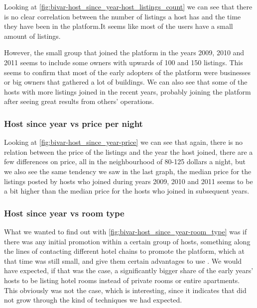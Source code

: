 Looking at \cref{fig:bivar-host_since_year-host_listings_count} we can see that
there is no clear correlation between the number of listings a host has and the
time they have been in the platform.It seems like most of the users have a small
amount of listings.

However, the small group that joined the platform in the years 2009, 2010 and
2011 seems to include some owners with upwards of 100 and 150 listings. This
seems to confirm that most of the early adopters of the platform were businesses
or big owners that gathered a lot of buildings. We can also see that some of the
hosts with more listings joined in the recent years, probably joining the
platform after seeing great results from others' operations.


\pagebreak
\subsubsection{Host since year vs price per night}


Looking at \cref{fig:bivar-host_since_year-price} we can see that again, there
is no relation between the price of the listings and the year the host joined,
there are a few differences on price, all in the neighbourhood of 80-125 dollars
a night, but we also see the same tendency we saw in the last graph, the median
price for the listings posted by hosts who joined during years 2009, 2010 and
2011 seems to be a bit higher than the median price for the hosts who joined in
subsequent years.

\pagebreak

\subsubsection{Host since year vs room type}



What we wanted to find out with \cref{fig:bivar-host_since_year-room_type} was
if there was any initial promotion within a certain group of hosts, something
along the lines of contacting different hotel chains to promote the platform,
which at that time was still small, and give them certain advantages to use
\airbnb.
We would have expected, if that was the case, a significantly bigger share of
the early years' hosts to be listing hotel rooms instead of private rooms or
entire apartments.
This obviously was not the case, which is interesting, since it indicates that
\airbnb did not grow through the kind of techniques we had expected.


